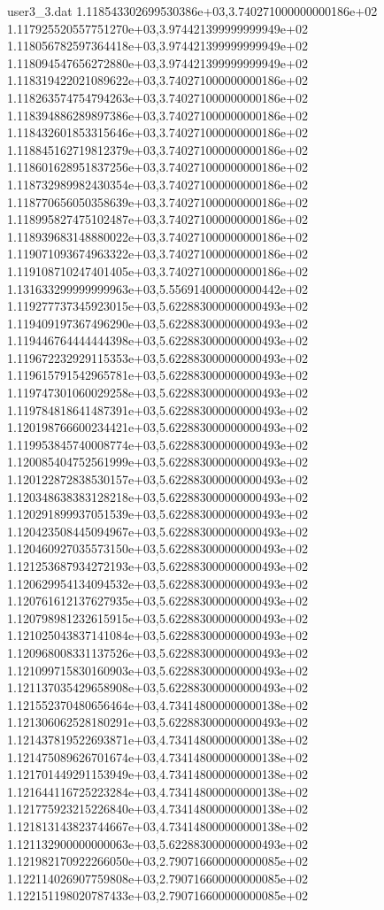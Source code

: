 \begin{filecontents}{user3_3.dat}
1.118543302699530386e+03,3.740271000000000186e+02
1.117925520557751270e+03,3.974421399999999949e+02
1.118056782597364418e+03,3.974421399999999949e+02
1.118094547656272880e+03,3.974421399999999949e+02
1.118319422021089622e+03,3.740271000000000186e+02
1.118263574754794263e+03,3.740271000000000186e+02
1.118394886289897386e+03,3.740271000000000186e+02
1.118432601853315646e+03,3.740271000000000186e+02
1.118845162719812379e+03,3.740271000000000186e+02
1.118601628951837256e+03,3.740271000000000186e+02
1.118732989982430354e+03,3.740271000000000186e+02
1.118770656050358639e+03,3.740271000000000186e+02
1.118995827475102487e+03,3.740271000000000186e+02
1.118939683148880022e+03,3.740271000000000186e+02
1.119071093674963322e+03,3.740271000000000186e+02
1.119108710247401405e+03,3.740271000000000186e+02
1.131633299999999963e+03,5.556914000000000442e+02
1.119277737345923015e+03,5.622883000000000493e+02
1.119409197367496290e+03,5.622883000000000493e+02
1.119446764444444398e+03,5.622883000000000493e+02
1.119672232929115353e+03,5.622883000000000493e+02
1.119615791542965781e+03,5.622883000000000493e+02
1.119747301060029258e+03,5.622883000000000493e+02
1.119784818641487391e+03,5.622883000000000493e+02
1.120198766600234421e+03,5.622883000000000493e+02
1.119953845740008774e+03,5.622883000000000493e+02
1.120085404752561999e+03,5.622883000000000493e+02
1.120122872838530157e+03,5.622883000000000493e+02
1.120348638383128218e+03,5.622883000000000493e+02
1.120291899937051539e+03,5.622883000000000493e+02
1.120423508445094967e+03,5.622883000000000493e+02
1.120460927035573150e+03,5.622883000000000493e+02
1.121253687934272193e+03,5.622883000000000493e+02
1.120629954134094532e+03,5.622883000000000493e+02
1.120761612137627935e+03,5.622883000000000493e+02
1.120798981232615915e+03,5.622883000000000493e+02
1.121025043837141084e+03,5.622883000000000493e+02
1.120968008331137526e+03,5.622883000000000493e+02
1.121099715830160903e+03,5.622883000000000493e+02
1.121137035429658908e+03,5.622883000000000493e+02
1.121552370480656464e+03,4.734148000000000138e+02
1.121306062528180291e+03,5.622883000000000493e+02
1.121437819522693871e+03,4.734148000000000138e+02
1.121475089626701674e+03,4.734148000000000138e+02
1.121701449291153949e+03,4.734148000000000138e+02
1.121644116725223284e+03,4.734148000000000138e+02
1.121775923215226840e+03,4.734148000000000138e+02
1.121813143823744667e+03,4.734148000000000138e+02
1.121132900000000063e+03,5.622883000000000493e+02
1.121982170922266050e+03,2.790716600000000085e+02
1.122114026907759808e+03,2.790716600000000085e+02
1.122151198020787433e+03,2.790716600000000085e+02

\end{filecontents}
